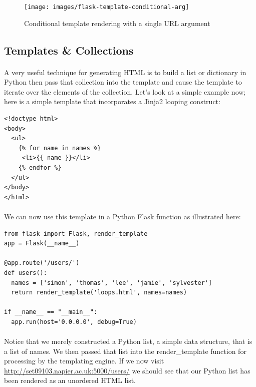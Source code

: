\documentclass[12pt, a4paper, oneside]{book}
\begin{document}
\begin{figure}[H]
\centering
\texttt{[image: images/flask-template-conditional-arg]}
\caption{Conditional template rendering with a single URL argument}
\label{fig:flask-template-conditional-arg}
\end{figure}


\subsection{Templates \& Collections}
\label{templates-collections}
\paragraph{} A very useful technique for generating HTML is to build a list or dictionary in Python then pass that collection into the template and cause the template to iterate over the elements of the collection. Let's look at a simple example now; here is a simple template that incorporates a Jinja2 looping construct:

\begin{lstlisting}
<!doctype html>
<body>
  <ul>
    {% for name in names %}
     <li>{{ name }}</li>
    {% endfor %}
  </ul>
</body>
</html>
\end{lstlisting}

\paragraph{} We can now use this template in a Python Flask function as illustrated here:

\begin{lstlisting}
from flask import Flask, render_template
app = Flask(__name__)

@app.route('/users/')
def users():
  names = ['simon', 'thomas', 'lee', 'jamie', 'sylvester']
  return render_template('loops.html', names=names)

if __name__ == "__main__":
  app.run(host='0.0.0.0', debug=True)
\end{lstlisting}

\paragraph{} Notice that we merely constructed a Python list, a simple data structure, that is a list of names. We then passed that list into the render\_template function for processing by the templating engine. If we now visit \url{http://set09103.napier.ac.uk:5000/users/} we should see that our Python list has been rendered as an unordered HTML list.
\end{document}
